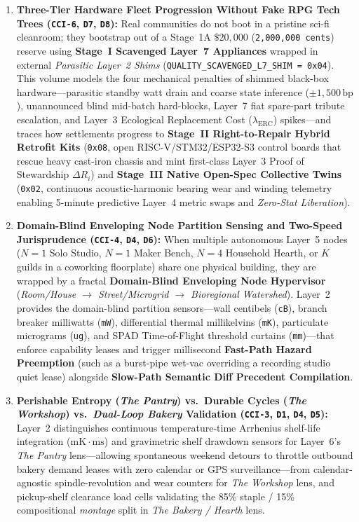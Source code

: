 \begin{enumerate}
    \item \textbf{Three-Tier Hardware Fleet Progression Without Fake RPG Tech Trees (\texttt{CCI-6}, \texttt{D7}, \texttt{D8}):} Real communities do not boot in a pristine sci-fi cleanroom; they bootstrap out of a Stage~1A $\$20{,}000$ (\texttt{2,000,000 cents}) reserve using \textbf{Stage~I Scavenged Layer~7 Appliances} wrapped in external \textit{Parasitic Layer~2 Shims} (\texttt{QUALITY\_SCAVENGED\_L7\_SHIM = 0x04}). This volume models the four mechanical penalties of shimmed black-box hardware---parasitic standby watt drain and coarse state inference ($\pm 1{,}500\,\mathrm{bp}$), unannounced blind mid-batch hard-blocks, Layer~7 fiat spare-part tribute escalation, and Layer~3 Ecological Replacement Cost ($\lambda_{\mathrm{ERC}}$) spikes---and traces how settlements progress to \textbf{Stage~II Right-to-Repair Hybrid Retrofit Kits} (\texttt{0x08}, open RISC-V/STM32/ESP32-S3 control boards that rescue heavy cast-iron chassis and mint first-class Layer~3 Proof of Stewardship $\Delta R_i$) and \textbf{Stage~III Native Open-Spec Collective Twins} (\texttt{0x02}, continuous acoustic-harmonic bearing wear and winding telemetry enabling 5-minute predictive Layer~4 metric swaps and \textit{Zero-Stat Liberation}).
    \item \textbf{Domain-Blind Enveloping Node Partition Sensing and Two-Speed Jurisprudence (\texttt{CCI-4}, \texttt{D4}, \texttt{D6}):} When multiple autonomous Layer~5 nodes ($N=1$ Solo Studio, $N=1$ Maker Bench, $N=4$ Household Hearth, or $K$ guilds in a coworking floorplate) share one physical building, they are wrapped by a fractal \textbf{Domain-Blind Enveloping Node Hypervisor} (\textit{Room/House $\to$ Street/Microgrid $\to$ Bioregional Watershed}). Layer~2 provides the domain-blind partition sensors---wall centibels (\texttt{cB}), branch breaker milliwatts (\texttt{mW}), differential thermal millikelvins (\texttt{mK}), particulate micrograms (\texttt{ug}), and SPAD Time-of-Flight threshold curtains (\texttt{mm})---that enforce capability leases and trigger millisecond \textbf{Fast-Path Hazard Preemption} (such as a burst-pipe wet-vac overriding a recording studio quiet lease) alongside \textbf{Slow-Path Semantic Diff Precedent Compilation}.
    \item \textbf{Perishable Entropy (\textit{The Pantry}) vs.\ Durable Cycles (\textit{The Workshop}) vs.\ \textit{Dual-Loop Bakery} Validation (\texttt{CCI-3}, \texttt{D1}, \texttt{D4}, \texttt{D5}):} Layer~2 distinguishes continuous temperature-time Arrhenius shelf-life integration ($\mathrm{mK \cdot ms}$) and gravimetric shelf drawdown sensors for Layer~6's \textit{The Pantry} lens---allowing spontaneous weekend detours to throttle outbound bakery demand leases with zero calendar or GPS surveillance---from calendar-agnostic spindle-revolution and wear counters for \textit{The Workshop} lens, and pickup-shelf clearance load cells validating the 85\% staple / 15\% compositional \textit{montage} split in \textit{The Bakery / Hearth} lens.

\end{enumerate}
